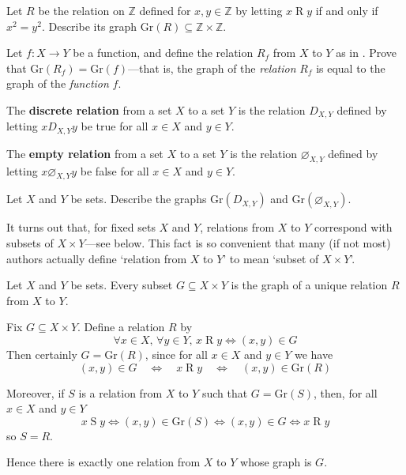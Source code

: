 \begin{exercise}
Let $R$ be the relation on $\mathbb{Z}$ defined for $x,y \in \mathbb{Z}$ by letting $x \mathrel{R} y$ if and only if $x^2=y^2$. Describe its graph $\mathrm{Gr}(R) \subseteq \mathbb{Z} \times \mathbb{Z}$.
\end{exercise}

\begin{exercise}
Let $f : X \to Y$ be a function, and define the relation $R_f$ from $X$ to $Y$ as in . Prove that $\mathrm{Gr}(R_f) = \mathrm{Gr}(f)$---that is, the graph of the \textit{relation} $R_f$ is equal to the graph of the \textit{function} $f$.
\end{exercise}

\begin{definition}
\label{defEmptyRelation}
\label{defDiscreteRelation}
The \textbf{discrete relation} from a set $X$ to a set $Y$ is the relation $D_{X,Y}$ defined by letting $x \mathrel{D_{X,Y}} y$ be true for all $x \in X$ and $y \in Y$.

The \textbf{empty relation} from a set $X$ to a set $Y$ is the relation $\varnothing_{X,Y}$  defined by letting $x \mathrel{\varnothing_{X,Y}} y$ be false for all $x \in X$ and $y \in Y$.
\end{definition}

\begin{exercise}
\label{exGraphOfEmptyAndDiscreteRelations}
Let $X$ and $Y$ be sets. Describe the graphs $\mathrm{Gr}(D_{X,Y})$ and $\mathrm{Gr}(\varnothing_{X,Y})$.
\end{exercise}

It turns out that, for fixed sets $X$ and $Y$, relations from $X$ to $Y$ correspond with subsets of $X \times Y$---see  below. This fact is so convenient that many (if not most) authors actually define `relation from $X$ to $Y$' to mean `subset of $X \times Y$'.

\begin{theorem}
\label{thmRelationsAsSubsets}
Let $X$ and $Y$ be sets. Every subset $G \subseteq X \times Y$ is the graph of a unique relation $R$ from $X$ to $Y$.
\end{theorem}
\begin{cproof}
Fix $G \subseteq X \times Y$. Define a relation $R$ by
\[ \forall x \in X,\, \forall y \in Y,\, x \mathbin{R} y \Leftrightarrow (x,y) \in G \]
Then certainly $G = \mathrm{Gr}(R)$, since for all $x \in X$ and $y \in Y$ we have
\[ (x,y) \in G \quad \Leftrightarrow \quad x \mathrel{R} y \quad \Leftrightarrow \quad (x,y) \in \mathrm{Gr}(R) \]

Moreover, if $S$ is a relation from $X$ to $Y$ such that $G=\mathrm{Gr}(S)$, then, for all $x \in X$ and $y \in Y$ 
\[ x \mathrel{S} y \Leftrightarrow (x,y) \in \mathrm{Gr}(S) \Leftrightarrow (x,y) \in G \Leftrightarrow x \mathrel{R} y \]
so $S=R$.

Hence there is exactly one relation from $X$ to $Y$ whose graph is $G$.
\end{cproof}

